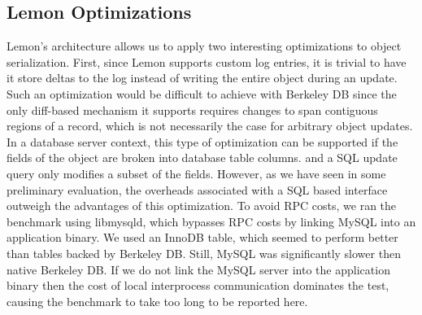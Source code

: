 \documentclass[10pt,letterpaper,twocolumn,english]{article}
\newcommand{\yad}{Lemon\xspace}
\begin{document}
\subsection{\yad Optimizations}

\label{version-pages}

\yad's architecture allows us to apply two interesting optimizations
to object serialization.  First, since \yad supports
custom log entries, it is trivial to have it store deltas to
the log instead of writing the entire object during an update.
Such an optimization would be difficult to achieve with Berkeley DB 
since the only diff-based mechanism it supports requires changes to 
span contiguous regions of a record, which is not necessarily the case for arbitrary
object updates.
In a database server context, this type of optimization can be
supported if the fields of the object are broken into database table
columns. and a SQL update query only modifies a subset of the fields. 
However, as we have seen in some preliminary evaluation, 
the overheads associated with a SQL based interface outweigh the
advantages of this optimization.  To avoid RPC costs, we ran the 
benchmark using libmysqld, which bypasses RPC costs by linking MySQL 
into an application binary.  We used an InnoDB table, which seemed 
to perform better than tables backed by Berkeley DB.  Still, MySQL 
was significantly slower then native Berkeley DB.  If we do not link 
the MySQL server into the application binary then the cost of local 
interprocess communication dominates the test, causing the benchmark to 
take too long to be reported here.


\end{document}
